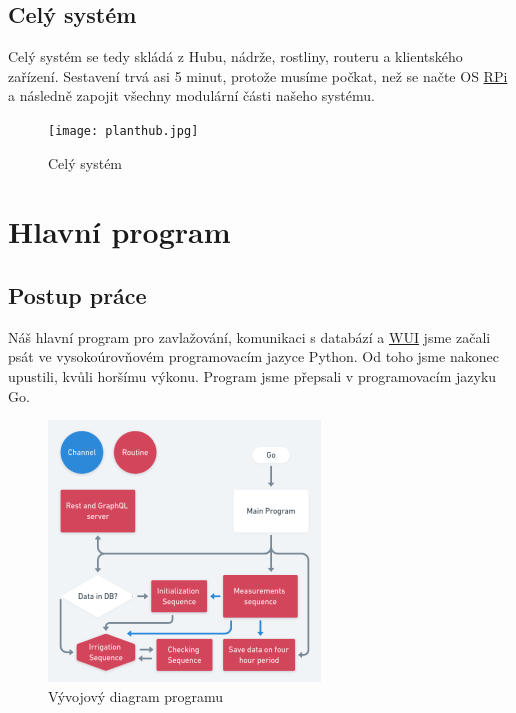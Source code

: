 \documentclass[czech,12pt,a4paper]{article}
\begin{document}
\clearpage

\subsection{Celý systém}

Celý systém se tedy skládá z Hubu, nádrže, rostliny, routeru a klientského zařízení. Sestavení trvá asi 5 minut, protože musíme počkat, než se načte OS \underline{\ac{RPi}} a následně zapojit všechny modulární části našeho systému.

\vspace*{1cm}
\begin{figure}[h]
	\centering
	\texttt{[image: planthub.jpg]}
	\caption{Celý systém}
\end{figure}

\clearpage

\section{Hlavní program} \label{secProgram}

\subsection{Postup práce}

Náš hlavní program pro zavlažování, komunikaci s databází a \underline{\ac{WUI}} jsme začali psát ve vysokoúrovňovém programovacím jazyce Python. Od toho jsme nakonec upustili, kvůli horšímu výkonu. Program jsme přepsali v programovacím jazyku Go.

\vspace*{1cm}
\begin{figure}[h]
	\centering
	\includegraphics[width=0.72\linewidth]{go.png}
	\caption{Vývojový diagram programu}
\end{figure}
\end{document}
